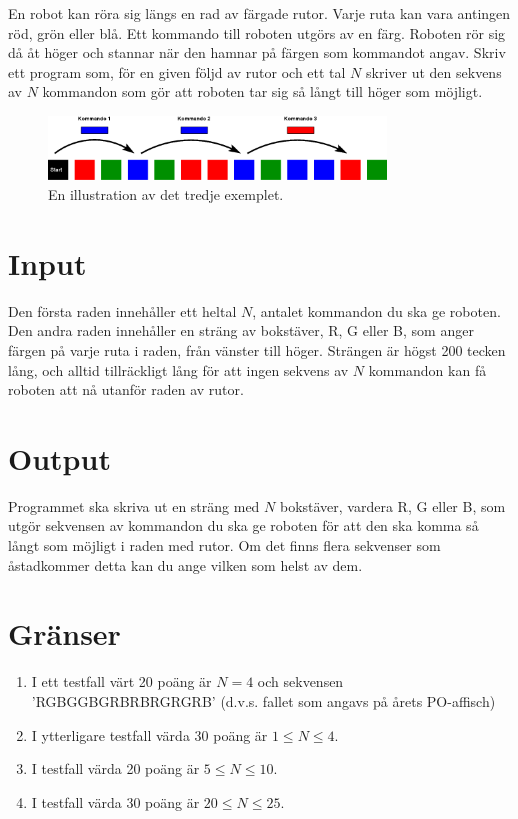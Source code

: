 
En robot kan röra sig längs en rad av färgade rutor. Varje ruta kan
vara antingen röd, grön eller blå. Ett kommando till roboten utgörs av
en färg. Roboten rör sig då åt höger och stannar när den hamnar på
färgen som kommandot angav. Skriv ett program som, för en given följd
av rutor och ett tal $N$ skriver ut den sekvens av $N$ kommandon som
gör att roboten tar sig så långt till höger som möjligt.

\begin{figure}[ht!]
\centering
\includegraphics[width=0.8\textwidth]{fargrobot.png}
\caption{En illustration av det tredje exemplet.}
\label{overflow}
\end{figure}


\section*{Input}
Den första raden innehåller ett heltal $N$, antalet kommandon du ska
ge roboten. Den andra raden innehåller en sträng av bokstäver, R, G eller B, som
anger färgen på varje ruta i raden, från vänster till höger. Strängen är högst
200 tecken lång, och alltid tillräckligt lång för att ingen sekvens
av $N$ kommandon kan få roboten att nå utanför raden av rutor.

\section*{Output}

Programmet ska skriva ut en sträng med $N$ bokstäver, vardera R, G
eller B, som utgör sekvensen av kommandon du ska ge roboten för att
den ska komma så långt som möjligt i raden med rutor. Om det finns
flera sekvenser som åstadkommer detta kan du ange vilken som helst av dem.

\section*{Gränser}

\begin{enumerate}
\item I ett testfall värt 20 poäng är $N=4$ och sekvensen
  'RGBGGBGRBRBRGRGRB' (d.v.s. fallet som angavs på årets PO-affisch)
\item I ytterligare testfall värda 30 poäng är $1 \le N \le 4$.
\item I testfall värda 20 poäng är $5 \le N \le 10$. 
\item I testfall värda 30 poäng är $20 \le N \le 25$.
\end{enumerate}

